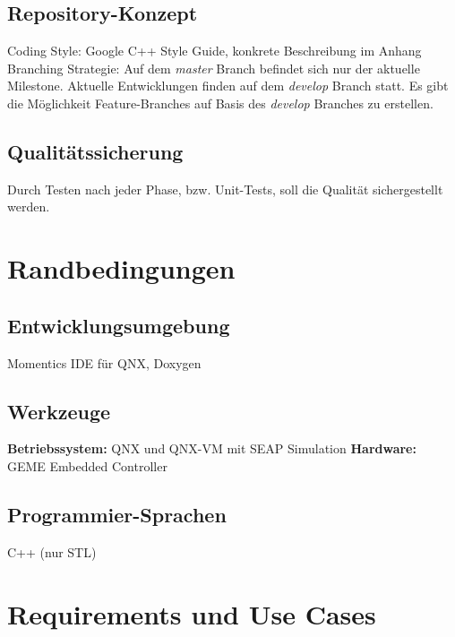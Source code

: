 \documentclass[oneside,a4paper,titlepage]{scrartcl} %
\begin{document}
\subsection{Repository-Konzept}
Coding Style: Google C++ Style Guide, konkrete Beschreibung im Anhang\newline
Branching Strategie: Auf dem \emph{master} Branch befindet sich nur der aktuelle Milestone.\newline
Aktuelle Entwicklungen finden auf dem \emph{develop} Branch statt.\newline
Es gibt die Möglichkeit Feature-Branches auf Basis des \emph{develop} Branches zu erstellen.

\subsection{Qualitätssicherung}
Durch Testen nach jeder Phase, bzw. Unit-Tests, soll die Qualität sichergestellt werden.

\newpage

\section{Randbedingungen}

\subsection{Entwicklungsumgebung}
Momentics IDE für QNX, Doxygen

\subsection{Werkzeuge}
\textbf{Betriebssystem:} QNX und QNX-VM mit SEAP Simulation\newline
\textbf{Hardware:} GEME Embedded Controller

\subsection{Programmier-Sprachen}
C++ (nur STL)

\section{Requirements und Use Cases}

\end{document}
